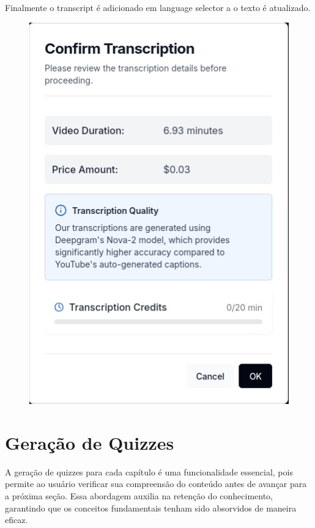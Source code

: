 \documentclass[tcc,capa]{texufpel}
\begin{document}
Finalmente o transcript é adicionado em language selector a o texto é atualizado.


\begin{figure}[H]
  \centering
  \includegraphics[width=\textwidth,height=0.45\textheight,keepaspectratio]{exemplo-slides/graphics/images/transcription-modal.png}
  \caption{}
  \label{fig:Transcription Modal}
\end{figure}



\section{Gera\c{c}\~ao de Quizzes}

A gera\c{c}\~ao de quizzes para cada cap\'{i}tulo \'e uma funcionalidade essencial, pois permite ao usu\'ario verificar sua compreens\~ao do conte\'udo antes de avan\c{c}ar para a pr\'oxima se\c{c}\~ao. Essa abordagem auxilia na reten\c{c}\~ao do conhecimento, garantindo que os conceitos fundamentais tenham sido absorvidos de maneira eficaz.
\end{document}
